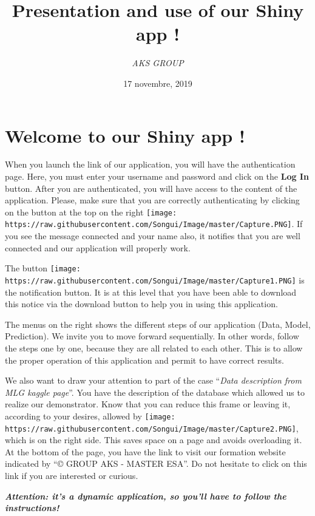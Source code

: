 \documentclass[]{article}
\title{\textbf{Presentation and use of our Shiny app ! }}
\author{\emph{AKS GROUP}}
\date{17 novembre, 2019}
\begin{document}
\maketitle

\section{Welcome to our Shiny app !}\label{welcome-to-our-shiny-app}

When you launch the link of our application, you will have the
authentication page. Here, you must enter your username and password and
click on the \textbf{Log In} button. After you are authenticated, you
will have access to the content of the application. Please, make sure
that you are correctly authenticating by clicking on the button at the
top on the right
\texttt{[image: https://raw.githubusercontent.com/Songui/Image/master/Capture.PNG]}.
If you see the message connected and your name also, it notifies that
you are well connected and our application will properly work.

The button
\texttt{[image: https://raw.githubusercontent.com/Songui/Image/master/Capture1.PNG]}
is the notification button. It is at this level that you have been able
to download this notice via the download button to help you in using
this application.

The menus on the right shows the different steps of our application
(Data, Model, Prediction). We invite you to move forward sequentially.
In other words, follow the steps one by one, because they are all
related to each other. This is to allow the proper operation of this
application and permit to have correct results.

We also want to draw your attention to part of the case ``\emph{Data
description from MLG kaggle page}''. You have the description of the
database which allowed us to realize our demonstrator. Know that you can
reduce this frame or leaving it, according to your desires, allowed by
\texttt{[image: https://raw.githubusercontent.com/Songui/Image/master/Capture2.PNG]},
which is on the right side. This saves space on a page and avoids
overloading it. At the bottom of the page, you have the link to visit
our formation website indicated by ``© GROUP AKS - MASTER ESA''. Do not
hesitate to click on this link if you are interested or curious.

\emph{\textbf{Attention: it's a dynamic application, so you'll have to
follow the instructions!}}
\end{document}
